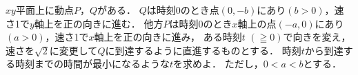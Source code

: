 \documentclass[../../main.tex]{subfiles}
\begin{document}
$xy$平面上に動点$P$，$Q$がある．
$Q$は時刻0のとき点$(0,-b)$にあり$(b>0)$，速さ1で$y$軸上を正の向きに進む．
他方$P$は時刻0のとき$x$軸上の点$(-a,0)$にあり$(a>0)$，速さ1で$x$軸上を正の向きに進み，
ある時刻$t$ $(\geqq0)$で向きを変え，速さを$\sqrt2$に変更して$Q$に到達するように直進するものとする．
時刻$t$から到達する時刻までの時間が最小になるような$t$を求めよ．
ただし，$0<a<b$とする．
\end{document}

